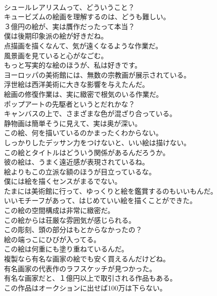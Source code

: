 \documentclass[8pt]{extreport}
\begin{document}
\begin{CJK}{UTF8}{min}
\\	シュールレアリスムって、どういうこと？	
\\	キュービズムの絵画を理解するのは、どうも難しい。	
\\	３億円の絵が、実は贋作だったって本当？	
\\	僕は後期印象派の絵が好きだね。	
\\	点描画を描くなんて、気が遠くなるような作業だ。	
\\	風景画を見ていると心がなごむ。	
\\	もっと写実的な絵のほうが、私は好きです。	
\\	ヨーロッパの美術館には、無数の宗教画が展示されている。	
\\	浮世絵は西洋美術に大きな影響を与えたんだ。	
\\	絵画の修復作業は、実に緻密で根気のいる作業だ。	
\\	ポップアートの先駆者というとだれかな？	
\\	キャンバスの上で、さまざまな色が混ざり合っている。	
\\	静物画は簡単そうに見えて、実は奥が深い。	
\\	この絵、何を描いているのかまったくわからない。	
\\	しっかりしたデッサン力をつけないと、いい絵は描けない。	
\\	この絵とタイトルはどういう関係があるんだろうか。	
\\	彼の絵は、うまく遠近感が表現されているね。	
\\	絵よりもこの立派な額のほうが目立っているな。	
\\	僕には絵を描くセンスがまるでない。	
\\	たまには美術館に行って、ゆっくりと絵を鑑賞するのもいいもんだ。	
\\	いいモチーフがあって、はじめていい絵を描くことができた。	
\\	この絵の空間構成は非常に緻密だ。	
\\	この絵からは荘厳な雰囲気が感じられる。	
\\	この彫刻、頭の部分はもとからなかったの？	
\\	絵の端っこにひびが入ってる。	
\\	この絵は何重にも塗り重ねているんだ。	
\\	複製なら有名な画家の絵でも安く買えるんだけどね。	
\\	有名画家の代表作のラフスケッチが見つかった。	
\\	有名な画家だと、１億円以上で取引される作品もある。	
\\	この作品はオークションに出せば100万は下らない。	

\end{CJK}
\end{document}
